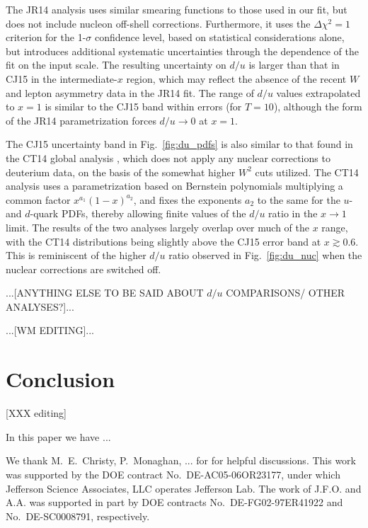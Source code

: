 \documentclass[aps,prd,amsmath,preprint]{revtex4}
\begin{document}
The JR14 analysis \cite{JR14} uses similar smearing functions to
those used in our fit, but does not include nucleon off-shell
corrections.  Furthermore, it uses the $\Delta\chi^2 = 1$ criterion
for the 1-$\sigma$ confidence level, based on statistical
considerations alone, but introduces additional systematic
uncertainties through the dependence of the fit on the input scale.
The resulting uncertainty on $d/u$ is larger than that in CJ15 in
the intermediate-$x$ region, which may reflect the absence of
the recent $W$ and lepton asymmetry data in the JR14 fit.
The range of $d/u$ values extrapolated to $x = 1$ is similar
to the CJ15 band within errors (for $T=10$), although the form
of the JR14 parametrization forces $d/u \to 0$ at $x=1$.


The CJ15 uncertainty band in Fig.~\ref{fig:du_pdfs} is also similar
to that found in the CT14 global analysis \cite{CT14}, which does not
apply any nuclear corrections to deuterium data, on the basis of the
somewhat higher $W^2$ cuts utilized.  The CT14 analysis uses a
parametrization based on Bernstein polynomials multiplying a
common factor $x^{a_1} (1-x)^{a_2}$, and fixes the exponents $a_2$
to the same for the $u$- and $d$-quark PDFs, thereby allowing
finite values of the $d/u$ ratio in the $x \to 1$ limit.
The results of the two analyses largely overlap over much of the
$x$ range, with the CT14 distributions being slightly above the
CJ15 error band at $x \gtrsim 0.6$.  This is reminiscent of the
higher $d/u$ ratio observed in Fig.~\ref{fig:du_nuc} when the
nuclear corrections are switched off.


{\color{red} ...[ANYTHING ELSE TO BE SAID ABOUT $d/u$ COMPARISONS/
OTHER ANALYSES?]...}


{\color{red} ...[WM EDITING]...}


\section{Conclusion} {\color{red} [XXX editing]}
\label{sec:conclusion}

In this paper we have ...




\newpage
\acknowledgments

We thank M.~E.~Christy, P.~Monaghan, ... for for helpful discussions.
This work was supported by the DOE contract No.~DE-AC05-06OR23177,
under which Jefferson Science Associates, LLC operates Jefferson Lab.
The work of J.F.O. and A.A. was supported in part by DOE contracts
No.~DE-FG02-97ER41922 and No.~DE-SC0008791, respectively.
\end{document}
